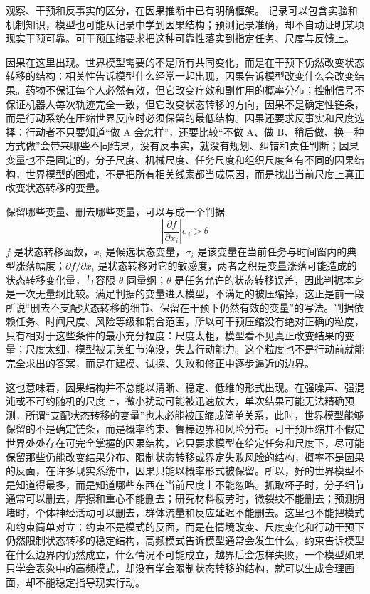 观察、干预和反事实的区分，在因果推断中已有明确框架。\cite{pearl2009causality} 记录可以包含实验和机制知识，模型也可能从记录中学到因果结构；预测记录准确，却不自动证明某项现实干预可靠。可干预压缩要求把这种可靠性落实到指定任务、尺度与反馈上。


因果在这里出现。世界模型需要的不是所有共同变化，而是在干预下仍然改变状态转移的结构：相关性告诉模型什么经常一起出现，因果告诉模型改变什么会改变结果。药物不保证每个人必然有效，但它改变疗效和副作用的概率分布；控制信号不保证机器人每次轨迹完全一致，但它改变状态转移的方向，因果不是确定性链条，而是行动系统在压缩世界反应时必须保留的最低结构。因果还要求反事实和尺度选择：行动者不只要知道“做 A 会怎样”，还要比较“不做 A、做 B、稍后做、换一种方式做”会带来哪些不同结果，没有反事实，就没有规划、纠错和责任判断；因果变量也不是固定的，分子尺度、机械尺度、任务尺度和组织尺度各有不同的因果结构，世界模型的困难，不是把所有相关线索都当成原因，而是找出当前尺度上真正改变状态转移的变量。

保留哪些变量、删去哪些变量，可以写成一个判据
\begin{equation}
\left|\frac{\partial f}{\partial x_i}\right|\sigma_i>\theta
\end{equation}
$f$ 是状态转移函数，$x_i$ 是候选状态变量，$\sigma_i$ 是该变量在当前任务与时间窗内的典型涨落幅度；$\partial f/\partial x_i$ 是状态转移对它的敏感度，两者之积是变量涨落可能造成的状态转移变化量，与容限 $\theta$ 同量纲；$\theta$ 是任务允许的状态转移误差，因此判据本身是一次无量纲比较。满足判据的变量进入模型，不满足的被压缩掉，这正是前一段所说“删去不支配状态转移的细节、保留在干预下仍然有效的变量”的写法。判据依赖任务、时间尺度、风险等级和耦合范围，所以可干预压缩没有绝对正确的粒度，只有相对于这些条件的最小充分粒度：尺度太粗，模型看不见真正改变结果的变量；尺度太细，模型被无关细节淹没，失去行动能力。这个粒度也不是行动前就能完全求出的答案，而是在建模、试探、失败和修正中逐步逼近的边界。

这也意味着，因果结构并不总能以清晰、稳定、低维的形式出现。在强噪声、强混沌或不可约随机的尺度上，微小扰动可能被迅速放大，单次结果可能无法精确预测，所谓“支配状态转移的变量”也未必能被压缩成简单关系，此时，世界模型能够保留的不是确定链条，而是概率约束、鲁棒边界和风险分布。可干预压缩并不假定世界处处存在可完全掌握的因果结构，它只要求模型在给定任务和尺度下，尽可能保留那些仍能改变结果分布、限制状态转移或界定失败风险的结构，概率不是因果的反面，在许多现实系统中，因果只能以概率形式被保留。所以，好的世界模型不是知道得最多，而是知道哪些东西在当前尺度上不能忽略。抓取杯子时，分子细节通常可以删去，摩擦和重心不能删去；研究材料疲劳时，微裂纹不能删去；预测拥堵时，个体神经活动可以删去，群体流量和反应延迟不能删去。这里也不能把模式和约束简单对立：约束不是模式的反面，而是在情境改变、尺度变化和行动干预下仍然限制状态转移的稳定结构，高频模式告诉模型通常会发生什么，约束告诉模型在什么边界内仍然成立，什么情况不可能成立，越界后会怎样失败，一个模型如果只学会表象中的高频模式，却没有学会限制状态转移的结构，就可以生成合理画面，却不能稳定指导现实行动。

